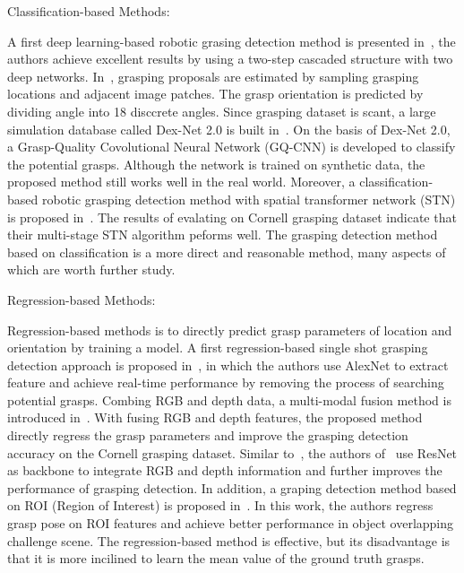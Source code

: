\documentclass[journal]{IEEEtran}
\begin{document}
\begin{bfseries}
	\label{classification}
	Classification-based Methods:
	\end{bfseries}A first deep learning-based robotic grasing detection method is presented in~\cite{lenz}, the authors achieve excellent results by using a two-step cascaded structure with two deep networks. In~\cite{pinto}, grasping proposals are estimated by sampling grasping locations and adjacent image patches. The grasp orientation is predicted by dividing angle into 18 disccrete angles. Since grasping dataset is scant, a large simulation database called Dex-Net 2.0 is built in~\cite{dexnet}. On the basis of Dex-Net 2.0, a Grasp-Quality Covolutional Neural Network (GQ-CNN) is developed to classify the potential grasps. Although the network is trained on synthetic data, the proposed method still works well in the real world. Moreover, a classification-based robotic grasping detection method with spatial transformer network (STN) is proposed in~\cite{park}. The results of evalating on Cornell grasping dataset indicate that their multi-stage STN algorithm peforms well. The grasping detection method based on classification is a more direct and reasonable method, many aspects of which are worth further study.

\begin{bfseries}
	\label{regression}
	Regression-based Methods:
\end{bfseries} 
Regression-based methods is to directly predict grasp parameters of location and orientation by training a model. A first regression-based single shot grasping detection approach is proposed in~\cite{Redmon}, in which the authors use AlexNet to extract feature and achieve real-time performance by removing the process of searching potential grasps. Combing RGB and depth data, a multi-modal fusion method is introduced in~\cite{robust}. With fusing RGB and depth features, the proposed method directly regress the grasp parameters and improve the grasping detection accuracy on the Cornell grasping dataset. Similar to~\cite{robust}, the authors of~\cite{kumra1} use ResNet as backbone to integrate RGB and depth information and further improves the performance of grasping detection. In addition, a graping detection method based on ROI (Region of Interest) is proposed in~\cite{roi}. In this work, the authors regress grasp pose on ROI features and achieve better performance in object overlapping challenge scene. The regression-based method is effective, but its disadvantage is that it is more incilined to learn the mean value of the ground truth grasps.
\end{document}
